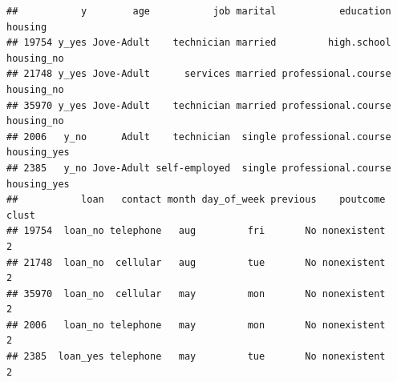 \documentclass[
]{article}
\newenvironment{Shaded}{\begin{snugshade}}{\end{snugshade}}
\newcommand{\DecValTok}[1]{\textcolor[rgb]{0.00,0.00,0.81}{#1}}
\newcommand{\FunctionTok}[1]{\textcolor[rgb]{0.00,0.00,0.00}{#1}}
\newcommand{\NormalTok}[1]{#1}
\newcommand{\SpecialCharTok}[1]{\textcolor[rgb]{0.00,0.00,0.00}{#1}}
\begin{document}
\begin{Shaded}
\end{Shaded}

\begin{verbatim}
##           y        age           job marital           education     housing
## 19754 y_yes Jove-Adult    technician married         high.school  housing_no
## 21748 y_yes Jove-Adult      services married professional.course  housing_no
## 35970 y_yes Jove-Adult    technician married professional.course  housing_no
## 2006   y_no      Adult    technician  single professional.course housing_yes
## 2385   y_no Jove-Adult self-employed  single professional.course housing_yes
##           loan   contact month day_of_week previous    poutcome clust
## 19754  loan_no telephone   aug         fri       No nonexistent     2
## 21748  loan_no  cellular   aug         tue       No nonexistent     2
## 35970  loan_no  cellular   may         mon       No nonexistent     2
## 2006   loan_no telephone   may         mon       No nonexistent     2
## 2385  loan_yes telephone   may         tue       No nonexistent     2
\end{verbatim}

\begin{Shaded}
\end{Shaded}
\end{document}

